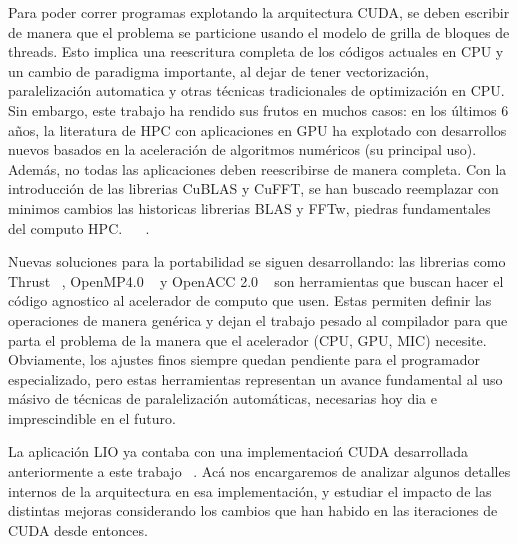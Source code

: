 Para poder correr programas explotando la arquitectura CUDA, se deben escribir de manera que
el problema se particione usando el modelo de grilla de bloques de threads. Esto implica una
reescritura completa de los c\'odigos actuales en CPU y un cambio de paradigma importante, al
dejar de tener vectorizaci\'on, paralelizaci\'on automatica y otras t\'ecnicas tradicionales
de optimizaci\'on en CPU. Sin embargo, este trabajo ha rendido sus frutos en muchos casos:
en los \'ultimos 6 a\~nos, la literatura de HPC con aplicaciones en GPU ha explotado con
desarrollos nuevos basados en la aceleraci\'on de algoritmos num\'ericos (su principal uso).
Adem\'as, no todas las aplicaciones deben reescribirse de manera completa. Con la introducci\'on
de las librerias CuBLAS y CuFFT, se han buscado reemplazar con minimos cambios las historicas
librerias BLAS y FFTw, piedras fundamentales del computo HPC. ~\cite{cublas} ~\cite{cufft}.

Nuevas soluciones para la portabilidad se siguen desarrollando: las librerias como Thrust ~\cite{thrust},
OpenMP4.0 ~\cite{OpenMPspec} y OpenACC 2.0 ~\cite{OpenACCSpec} son herramientas que buscan hacer el
c\'odigo agnostico al acelerador de computo que usen. Estas permiten definir las operaciones de
manera gen\'erica y dejan el trabajo pesado al compilador para que parta el problema de la manera
que el acelerador (CPU, GPU, MIC) necesite. Obviamente, los ajustes finos siempre quedan pendiente para
el programador especializado, pero estas herramientas representan un avance fundamental al uso
m\'asivo de t\'ecnicas de paralelizaci\'on autom\'aticas, necesarias hoy dia e imprescindible en el
futuro.

La aplicaci\'on LIO ya contaba con una implementacio\'n CUDA desarrollada anteriormente a este
trabajo ~\cite{TesisNitsche}. Ac\'a nos encargaremos de analizar algunos detalles internos de
la arquitectura en esa implementaci\'on, y estudiar el impacto de las distintas mejoras considerando
los cambios que han habido en las iteraciones de CUDA desde entonces.

